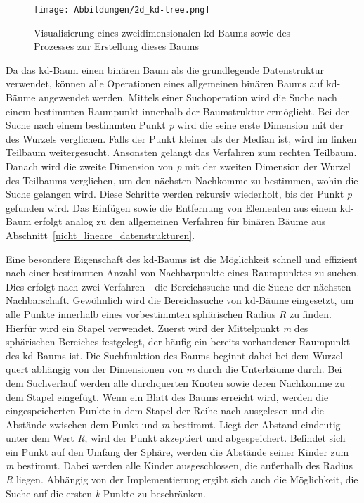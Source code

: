
\begin{figure}[!b]
	\texttt{[image: Abbildungen/2d\_kd-tree.png]}
	\centering
	\caption{Visualisierung eines zweidimensionalen kd-Baums sowie des Prozesses zur Erstellung dieses Baums \autocite[60]{garcica-garcia_alberto_towards_2015}}
	\label{fig: kd-tree_creation}
\end{figure}

Da das kd-Baum einen binären Baum als die grundlegende Datenstruktur verwendet, können alle Operationen eines allgemeinen binären Baums auf kd-Bäume angewendet werden. Mittels einer Suchoperation wird die Suche nach einem bestimmten Raumpunkt innerhalb der Baumstruktur ermöglicht. Bei der Suche nach einem bestimmten Punkt \textit{p} wird die seine erste Dimension mit der des Wurzels verglichen. Falls der Punkt kleiner als der Median ist, wird im linken Teilbaum weitergesucht. Ansonsten gelangt das Verfahren zum rechten Teilbaum. Danach wird die zweite Dimension von \textit{p} mit der zweiten Dimension der Wurzel des Teilbaums verglichen, um den nächsten Nachkomme zu bestimmen, wohin die Suche gelangen wird. Diese Schritte werden rekursiv wiederholt, bis der Punkt \textit{p} gefunden wird. Das Einfügen sowie die Entfernung von Elementen aus einem kd-Baum erfolgt analog zu den allgemeinen Verfahren für binären Bäume aus Abschnitt~\ref{nicht_lineare_datenstrukturen}. \autocite[94]{saha_advanced_2019}

Eine besondere Eigenschaft des kd-Baums ist die Möglichkeit schnell und effizient nach einer bestimmten Anzahl von Nachbarpunkte eines Raumpunktes zu suchen. Dies erfolgt nach zwei Verfahren - die Bereichssuche und die Suche der nächsten Nachbarschaft. Gewöhnlich wird die Bereichssuche von kd-Bäume eingesetzt, um alle Punkte innerhalb eines vorbestimmten sphärischen Radius \textit{R} zu finden. Hierfür wird ein Stapel verwendet. Zuerst wird der Mittelpunkt \textit{m} des sphärischen Bereiches festgelegt, der häufig ein bereits vorhandener Raumpunkt des kd-Baums ist. Die Suchfunktion des Baums beginnt dabei bei dem Wurzel quert abhängig von der Dimensionen von \textit{m} durch die Unterbäume durch. Bei dem Suchverlauf werden alle durchquerten Knoten sowie deren Nachkomme zu dem Stapel eingefügt. Wenn ein Blatt des Baums erreicht wird, werden die eingespeicherten Punkte in dem Stapel der Reihe nach ausgelesen und die Abstände zwischen dem Punkt und \textit{m} bestimmt. Liegt der Abstand eindeutig unter dem Wert \textit{R}, wird der Punkt akzeptiert und abgespeichert. Befindet sich ein Punkt auf den Umfang der Sphäre, werden die Abstände seiner Kinder zum \textit{m} bestimmt. Dabei werden alle Kinder ausgeschlossen, die außerhalb des Radius \textit{R} liegen. Abhängig von der Implementierung ergibt sich auch die Möglichkeit, die Suche auf die ersten \textit{k} Punkte zu beschränken. \autocite[95]{saha_advanced_2019}


